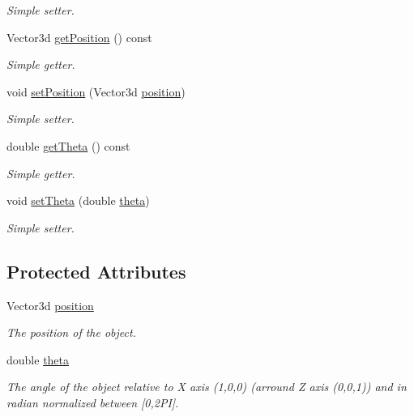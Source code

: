 \begin{DoxyCompactItemize}
\begin{DoxyCompactList}\small\item\em Simple setter. \end{DoxyCompactList}\item 
Vector3d \hyperlink{classLocalizedObject_a711da75e218c7cc64b57088d3c1a8c73}{get\+Position} () const 
\begin{DoxyCompactList}\small\item\em Simple getter. \end{DoxyCompactList}\item 
void \hyperlink{classLocalizedObject_adbdcf655524574dc3c1a4d3f9adfd259}{set\+Position} (Vector3d \hyperlink{classLocalizedObject_a340834deefc9e5c39da1f26c4ebf4f8c}{position})
\begin{DoxyCompactList}\small\item\em Simple setter. \end{DoxyCompactList}\item 
double \hyperlink{classLocalizedObject_a9a5927a035686eccc401aa2b1e8d0595}{get\+Theta} () const 
\begin{DoxyCompactList}\small\item\em Simple getter. \end{DoxyCompactList}\item 
void \hyperlink{classLocalizedObject_ac23f5d3d6afebb24e5b52c71197f3551}{set\+Theta} (double \hyperlink{classLocalizedObject_aa5f7b070b6dc97a64a90797a0bca56e2}{theta})
\begin{DoxyCompactList}\small\item\em Simple setter. \end{DoxyCompactList}\end{DoxyCompactItemize}
\subsection*{Protected Attributes}
\begin{DoxyCompactItemize}
\item 
Vector3d \hyperlink{classLocalizedObject_a340834deefc9e5c39da1f26c4ebf4f8c}{position}\hypertarget{classLocalizedObject_a340834deefc9e5c39da1f26c4ebf4f8c}{}\label{classLocalizedObject_a340834deefc9e5c39da1f26c4ebf4f8c}

\begin{DoxyCompactList}\small\item\em The position of the object. \end{DoxyCompactList}\item 
double \hyperlink{classLocalizedObject_aa5f7b070b6dc97a64a90797a0bca56e2}{theta}\hypertarget{classLocalizedObject_aa5f7b070b6dc97a64a90797a0bca56e2}{}\label{classLocalizedObject_aa5f7b070b6dc97a64a90797a0bca56e2}

\begin{DoxyCompactList}\small\item\em The angle of the object relative to X axis (1,0,0) (arround Z axis (0,0,1)) and in radian normalized between \mbox{[}0,2\+PI\mbox{]}. \end{DoxyCompactList}\end{DoxyCompactItemize}


